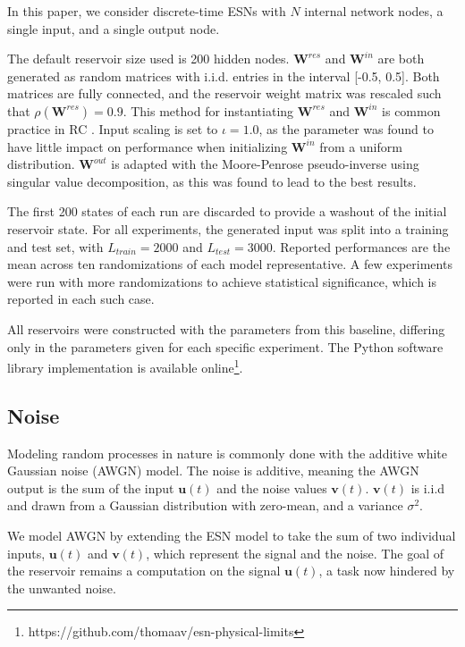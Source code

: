 In this paper, we consider discrete-time ESNs with $N$ internal network nodes, a
single input, and a single output node.

The default reservoir size used is 200 hidden nodes. $\mathbf{W}^{res}$ and
$\mathbf{W}^{in}$ are both generated as random matrices with i.i.d. entries in
the interval [-0.5, 0.5]. Both matrices are fully connected, and the reservoir
weight matrix was rescaled such that $\rho(\mathbf{W}^{res}) = 0.9$. This method
for instantiating $\mathbf{W}^{res}$ and $\mathbf{W}^{in}$ is common practice in
RC \cite{montavon_practical_2012}. Input scaling is set to $\iota = 1.0$, as the
parameter was found to have little impact on performance when initializing
$\mathbf{W}^{in}$ from a uniform distribution. $\mathbf{W}^{out}$ is adapted
with the Moore-Penrose pseudo-inverse using singular value decomposition, as
this was found to lead to the best results.

The first 200 states of each run are discarded to provide a washout of the
initial reservoir state. For all experiments, the generated input was split into
a training and test set, with $L_{train} = 2000$ and $L_{test} = 3000$. Reported
performances are the mean across ten randomizations of each model
representative. A few experiments were run with more randomizations to achieve
statistical significance, which is reported in each such case.

All reservoirs were constructed with the parameters from this baseline,
differing only in the parameters given for each specific experiment. The Python
software library implementation is available
online\footnote{https://github.com/thomaav/esn-physical-limits}.

\subsection{Noise}

Modeling random processes in nature is commonly done with the additive white
Gaussian noise (AWGN) model. The noise is additive, meaning the AWGN output is
the sum of the input $\mathbf{u}(t)$ and the noise values
$\mathbf{v}(t)$. $\mathbf{v}(t)$ is i.i.d and drawn from a Gaussian distribution
with zero-mean, and a variance $\sigma^{2}$.

We model AWGN by extending the ESN model to take the sum of two individual
inputs, $\mathbf{u}(t)$ and $\mathbf{v}(t)$, which represent the signal and the
noise. The goal of the reservoir remains a computation on the signal
$\mathbf{u}(t)$, a task now hindered by the unwanted noise.

